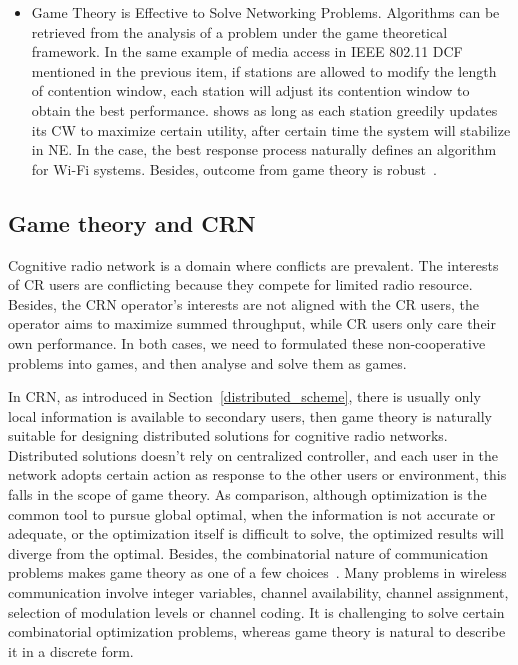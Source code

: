 \begin{itemize}
\item Game Theory is Effective to Solve Networking Problems. 
Algorithms can be retrieved from the analysis of a problem under the game theoretical framework.
In the same example of media access in IEEE 802.11 DCF mentioned in the previous item, if stations are allowed to modify the length of contention window, each station will adjust its contention window to obtain the best performance.
\cite{contentiongame_07} shows as long as each station greedily updates its CW to maximize certain utility, after certain time the system will stabilize in NE. 
In the case, the best response process naturally defines an algorithm for Wi-Fi systems.
%
Besides, outcome from game theory is robust~\cite{Han:2008:RAW:1457343}.
\end{itemize}







\subsection{Game theory and CRN}
Cognitive radio network is a domain where conflicts are prevalent.
The interests of CR users are conflicting because they compete for limited radio resource.
Besides, the CRN operator's interests are not aligned with the CR users, \eg the operator aims to maximize summed throughput, while CR users only care their own performance.
In both cases, we need to formulated these non-cooperative problems into games, and then analyse and solve them as games.

In CRN, as introduced in Section~\ref{distributed_scheme}, there is usually only local information is available to secondary users, then game theory is naturally suitable for designing distributed solutions for cognitive radio networks.
Distributed solutions doesn't rely on centralized controller, and each user in the network adopts certain action as response to the other users or environment, this falls in the scope of game theory.
As comparison, although optimization is the common tool to pursue global optimal, when the information is not accurate or adequate, or the optimization itself is difficult to solve, the optimized results will diverge from the optimal.
Besides, the combinatorial nature of communication problems makes game theory as one of a few choices~\cite{Han:2008:RAW:1457343}.
Many problems in wireless communication involve integer variables, \ie channel availability, channel assignment, selection of modulation levels or channel coding.
It is challenging to solve certain combinatorial optimization problems, whereas game theory is natural to describe it in a discrete form.

